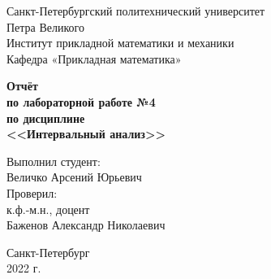 \thispagestyle{empty}

\begin{center}
\large
Санкт-Петербургский политехнический университет\\
Петра Великого\\
Институт прикладной математики и механики\\
Кафедра «Прикладная математика»\\
\end{center}

\vspace{8em}

\begin{center}
\bfseries
Отчёт\\
по лабораторной работе №4\\
по дисциплине\\
<<Интервальный анализ>>\\
\end{center}

\vspace{8em}

\begin{flushright}
Выполнил студент:\\
Величко Арсений Юрьевич\\
\vspace{2em}
Проверил:\\
к.ф.-м.н., доцент\\
Баженов Александр Николаевич\\
\end{flushright}

\vfill

\begin{center}
Санкт-Петербург\\
2022 г.\\
\end{center}
\newpage